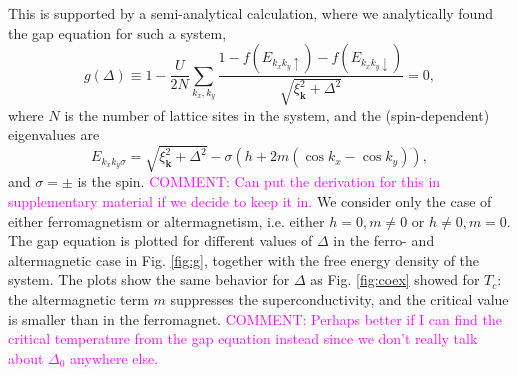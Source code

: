 \documentclass[aps,twocolumn,amsmath,amssymb,preprintnumbers,floatfix,prl,superscriptaddress,longbibliography]{revtex4-2}%
\newcommand{\hans}[1]{\textcolor{Magenta}{{#1}}}
\begin{document}
This is supported by a semi-analytical calculation, where we analytically found the gap equation for such a system, 
\begin{equation}
    g(\Delta) \equiv 1 - \frac{U}{2 N} \sum_{k_x, k_y} \frac{1 - f(E_{k_x k_y \uparrow}) - f(E_{k_x k_y \downarrow})}{\sqrt{\xi_\mathbf{k}^2 + \Delta^2}} = 0,
\end{equation}
where $N$ is the number of lattice sites in the system, and the (spin-dependent) eigenvalues are
\begin{equation}
    E_{k_x k_y \sigma} = \sqrt{\xi_{\mathbf{k}}^2 + \Delta^2}
    -\sigma( h  + 2m (\cos{k_x} - \cos{k_y})),
\end{equation}
and $\sigma = \pm $ is the spin. 
\hans{COMMENT: Can put the derivation for this in supplementary material if we decide to keep it in.}
We consider only the case of either ferromagnetism or altermagnetism, i.e. either $h= 0, m\neq 0$ or $h\neq 0, m= 0$. The gap equation is plotted for different values of $\Delta$ in the ferro- and altermagnetic case in Fig. \ref{fig:g}, together with the free energy density of the system. The plots show the same behavior for $\Delta$ as Fig. \ref{fig:coex} showed for $T_c$: the altermagnetic term $m$ suppresses the superconductivity, and the critical value is smaller than in the ferromagnet.
\hans{COMMENT: Perhaps better if I can find the critical temperature from the gap equation instead since we don't really talk about $\Delta_0$ anywhere else.}
\end{document}
